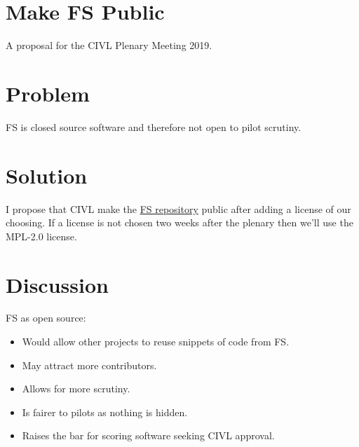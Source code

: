 \documentclass{article}
\begin{document}
\section*{Make FS Public}

A proposal for the CIVL Plenary Meeting 2019.

\section*{Problem}
FS is closed source software and therefore not open to pilot scrutiny.

\section*{Solution}
I propose that CIVL make the \href{https://github.com/FAI-CIVL/FS}{FS
repository} public after adding a license of our choosing. If a license is not
chosen two weeks after the plenary then we'll use the MPL-2.0 license.

\section*{Discussion}
FS as open source:\\
\begin{itemize}
    \item Would allow other projects to reuse snippets of code from FS.
    \item May attract more contributors.
    \item Allows for more scrutiny.
    \item Is fairer to pilots as nothing is hidden.
    \item Raises the bar for scoring software seeking CIVL approval.
\end{itemize}
\end{document}
